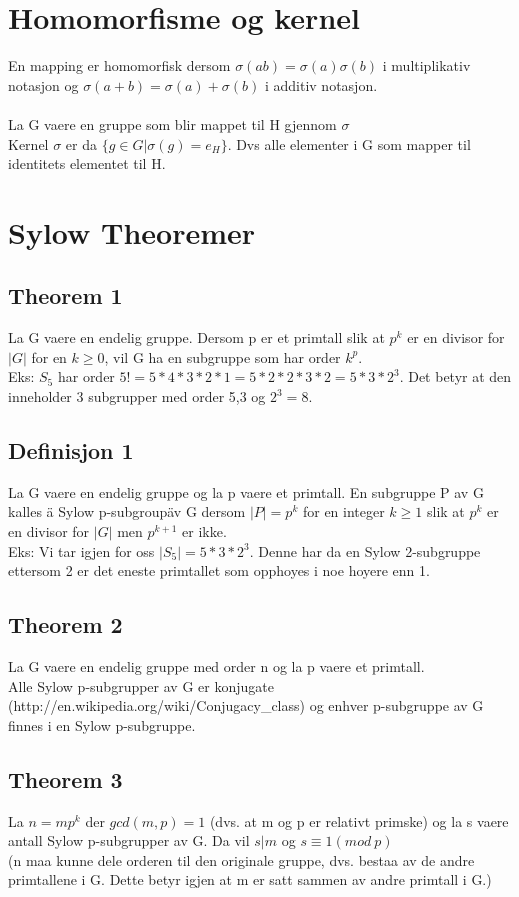 \documentclass[12pt,a4paper]{article}
\begin{document}
\section*{Homomorfisme og kernel}
En mapping er homomorfisk dersom $\sigma(ab) = \sigma(a) \sigma(b)$ i multiplikativ notasjon og $\sigma(a+b) = \sigma(a) + \sigma(b)$ i additiv notasjon. \\\\

La G vaere en gruppe som blir mappet til H gjennom $\sigma$\\
Kernel $\sigma$ er da $\{g\in G | \sigma(g) = e_H\}$. Dvs alle elementer i G som mapper til identitets elementet til H.

\section*{Sylow Theoremer}
\subsection*{Theorem 1}
La G vaere en endelig gruppe. Dersom p er et primtall slik at $p^k$ er en divisor for $|G|$ for en $k\geq0$, vil G ha en subgruppe som har order $k^p$. \\
Eks: $S_5$ har order $5! = 5*4*3*2*1 = 5*2*2*3*2 = 5*3*2^3$. Det betyr at den inneholder 3 subgrupper med order 5,3 og $2^3 = 8$.

\subsection*{Definisjon 1}
La G vaere en endelig gruppe og la p vaere et primtall. En subgruppe P av G kalles \"a Sylow p-subgroup\" av G  dersom $|P| = p^k$ for en integer $k\geq 1$ slik at $p^k$ er en divisor for $|G|$ men $p^{k+1}$ er ikke.\\
Eks: Vi tar igjen for oss $|S_5| = 5*3*2^3$. Denne har da en Sylow 2-subgruppe ettersom 2 er det eneste primtallet som opphoyes i noe hoyere enn 1. 

\subsection*{Theorem 2}
La G vaere en endelig gruppe med order n og la p vaere et primtall.\\
Alle Sylow p-subgrupper av G er konjugate (http://en.wikipedia.org/wiki/Conjugacy\_class) og enhver p-subgruppe av G finnes i en Sylow p-subgruppe. 

\subsection*{Theorem 3}
La $n = mp^k$ der $gcd(m,p) = 1$ (dvs. at m og p er relativt primske) og la s vaere antall Sylow p-subgrupper av G. Da vil $s | m $ og $s \equiv 1(mod\  p )$\\
(n maa kunne dele orderen til den originale gruppe, dvs. bestaa av de andre primtallene i G. Dette betyr igjen at m er satt sammen av andre primtall i G.)\\\\
\end{document}
